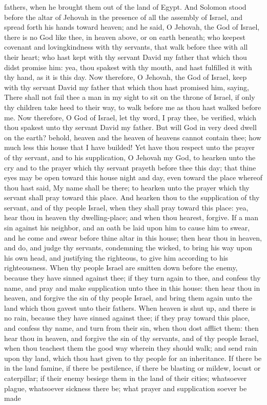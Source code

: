 fathers, when he brought them out of the land of Egypt.  And Solomon stood before the altar of Jehovah in the presence of all the assembly of Israel, and spread forth his hands toward heaven; and he said, O Jehovah, the God of Israel, there is no God like thee, in heaven above, or on earth beneath; who keepest covenant and lovingkindness with thy servants, that walk before thee with all their heart; who hast kept with thy servant David my father that which thou didst promise him: yea, thou spakest with thy mouth, and hast fulfilled it with thy hand, as it is this day. Now therefore, O Jehovah, the God of Israel, keep with thy servant David my father that which thou hast promised him, saying, There shall not fail thee a man in my sight to sit on the throne of Israel, if only thy children take heed to their way, to walk before me as thou hast walked before me. Now therefore, O God of Israel, let thy word, I pray thee, be verified, which thou spakest unto thy servant David my father.  But will God in very deed dwell on the earth? behold, heaven and the heaven of heavens cannot contain thee; how much less this house that I have builded! Yet have thou respect unto the prayer of thy servant, and to his supplication, O Jehovah my God, to hearken unto the cry and to the prayer which thy servant prayeth before thee this day; that thine eyes may be open toward this house night and day, even toward the place whereof thou hast said, My name shall be there; to hearken unto the prayer which thy servant shall pray toward this place. And hearken thou to the supplication of thy servant, and of thy people Israel, when they shall pray toward this place: yea, hear thou in heaven thy dwelling-place; and when thou hearest, forgive.  If a man sin against his neighbor, and an oath be laid upon him to cause him to swear, and he come and swear before thine altar in this house; then hear thou in heaven, and do, and judge thy servants, condemning the wicked, to bring his way upon his own head, and justifying the righteous, to give him according to his righteousness.  When thy people Israel are smitten down before the enemy, because they have sinned against thee; if they turn again to thee, and confess thy name, and pray and make supplication unto thee in this house: then hear thou in heaven, and forgive the sin of thy people Israel, and bring them again unto the land which thou gavest unto their fathers.  When heaven is shut up, and there is no rain, because they have sinned against thee; if they pray toward this place, and confess thy name, and turn from their sin, when thou dost afflict them: then hear thou in heaven, and forgive the sin of thy servants, and of thy people Israel, when thou teachest them the good way wherein they should walk; and send rain upon thy land, which thou hast given to thy people for an inheritance.  If there be in the land famine, if there be pestilence, if there be blasting or mildew, locust or caterpillar; if their enemy besiege them in the land of their cities; whatsoever plague, whatsoever sickness there be; what prayer and supplication soever be made 